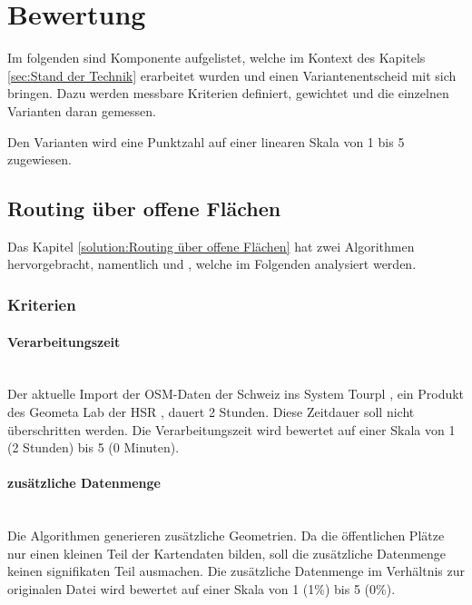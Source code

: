 \section{Bewertung}
\label{sec:Bewertung}
Im folgenden sind Komponente aufgelistet, welche im Kontext des Kapitels \ref{sec:Stand der Technik} erarbeitet wurden und einen Variantenentscheid mit sich bringen. Dazu werden messbare Kriterien definiert, gewichtet und die einzelnen Varianten daran gemessen.

Den Varianten wird eine Punktzahl auf einer linearen Skala von 1 bis 5 zugewiesen.

\subsection{Routing über offene Flächen}
\label{eval:Routing über offene Flächen}

Das Kapitel \ref{solution:Routing über offene Flächen} hat zwei Algorithmen hervorgebracht, namentlich  und , welche im Folgenden analysiert werden.

\subsubsection{Kriterien}
\label{sub:Kriterien}

\paragraph{Verarbeitungszeit}\label{criteria:Verarbeitungszeit}~\\
Der aktuelle Import der \ac{OSM}-Daten der Schweiz ins System Tourpl \cite{hsr_tourpl}, ein Produkt des Geometa Lab der HSR \cite{geometa_lab_hsr}, dauert 2 Stunden. Diese Zeitdauer soll nicht überschritten werden. Die Verarbeitungszeit wird bewertet auf einer Skala von 1 (2 Stunden) bis 5 (0 Minuten).


\paragraph{zusätzliche Datenmenge}\label{criteria:zusätzliche Datenmenge}~\\
Die Algorithmen generieren zusätzliche Geometrien. Da die öffentlichen Plätze nur einen kleinen Teil der Kartendaten bilden, soll die zusätzliche Datenmenge keinen signifikaten Teil ausmachen. Die zusätzliche Datenmenge im Verhältnis zur originalen Datei wird bewertet auf einer Skala von 1 (1\%) bis 5 (0\%).


